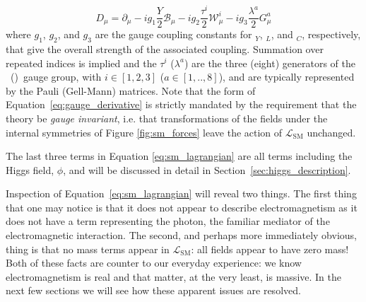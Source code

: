 \begin{equation}
	\mathit{D}_{\mu} = \partial_{\mu} - i g_1 \frac{Y}{2} \mathcal{B}_{\mu} - i g_2 \frac{\tau^i}{2} \mathcal{W}_{\mu}^i - i g_3 \frac{\lambda^a}{2} G_{\mu}^a
	\label{eq:gauge_derivative}
\end{equation}
where $g_1$, $g_2$, and $g_3$ are the gauge coupling constants for \Uone$_{Y}$, \SUtwo$_{L}$, and \SUthree$_{C}$, respectively, that give the overall strength of the associated coupling.
Summation over repeated indices is implied and the $\tau^i$ ($\lambda^a$) are the three (eight)
generators of the \SUtwo~(\SUthree)~gauge group, with $i \in [1,2,3]$ ($a \in [1,..,8]$), and
are typically represented by the Pauli (Gell-Mann) matrices. Note that the form of Equation~\ref{eq:gauge_derivative} is strictly mandated by the requirement that the theory
be \textit{gauge invariant}, i.e. that transformations of the fields under the internal symmetries
of Figure \ref{fig:sm_forces} leave the action of $\mathcal{L}_{\text{SM}}$ unchanged.

The last three terms in Equation \ref{eq:sm_lagrangian} are all terms including the Higgs field, $\phi$,
and will be discussed in detail in Section~\ref{sec:higgs_description}.

Inspection of Equation~\ref{eq:sm_lagrangian} will reveal two things. The first thing that one
may notice is that it does not appear to describe electromagnetism as it does not have a
term representing the photon, the familiar mediator of the electromagnetic interaction.
The second, and perhaps more immediately obvious, thing is that no mass terms
appear in $\mathcal{L}_{\text{SM}}$: all fields appear to have zero mass! Both of these
facts are counter to our everyday experience: we know electromagnetism is real and that matter,
at the very least, is massive. In the next few sections we will see how these apparent
issues are resolved.


\FloatBarrier



